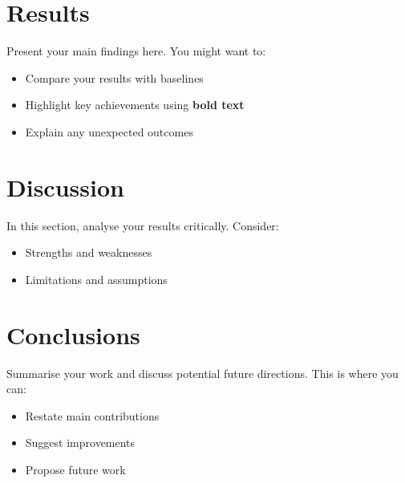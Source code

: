 \documentclass[11pt]{article}
\begin{document}
\begin{multicols}{2}
        \section{Results}
        Present your main findings here. You might want to:
        \begin{itemize}
            \item Compare your results with baselines
            \item Highlight key achievements using \textbf{bold text}
            \item Explain any unexpected outcomes
        \end{itemize}

        \section{Discussion}
        In this section, analyse your results critically. Consider:
        \begin{itemize}
            \item Strengths and weaknesses
            \item Limitations and assumptions
        \end{itemize}

        \section{Conclusions}
        Summarise your work and discuss potential future directions. This is where you can:
        \begin{itemize}
            \item Restate main contributions
            \item Suggest improvements
            \item Propose future work
        \end{itemize}

        
        
    
    \end{multicols}
\end{document}
